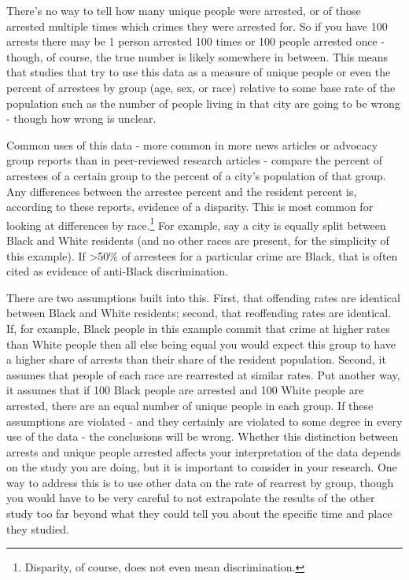 \documentclass[
]{krantz}
\begin{document}
There's no way to tell how many unique people were arrested,
or of those arrested multiple times which crimes they were
arrested for. So if you have 100 arrests there may be 1
person arrested 100 times or 100 people arrested once -
though, of course, the true number is likely somewhere in
between. This means that studies that try to use this data
as a measure of unique people or even the percent of
arrestees by group (age, sex, or race) relative to some base
rate of the population such as the number of people living
in that city are going to be wrong - though how wrong is
unclear.

Common uses of this data - more common in more news articles
or advocacy group reports than in peer-reviewed research
articles - compare the percent of arrestees of a certain
group to the percent of a city's population of that group.
Any differences between the arrestee percent and the
resident percent is, according to these reports, evidence of
a disparity. This is most common for looking at differences
by race.\footnote{Disparity, of course, does not even mean
  discrimination.} For example, say a city is equally split
between Black and White residents (and no other races are
present, for the simplicity of this example). If
\textgreater50\% of arrestees for a particular crime are
Black, that is often cited as evidence of anti-Black
discrimination.

There are two assumptions built into this. First, that
offending rates are identical between Black and White
residents; second, that reoffending rates are identical. If,
for example, Black people in this example commit that crime
at higher rates than White people then all else being equal
you would expect this group to have a higher share of
arrests than their share of the resident population. Second,
it assumes that people of each race are rearrested at
similar rates. Put another way, it assumes that if 100 Black
people are arrested and 100 White people are arrested, there
are an equal number of unique people in each group. If these
assumptions are violated - and they certainly are violated
to some degree in every use of the data - the conclusions
will be wrong. Whether this distinction between arrests and
unique people arrested affects your interpretation of the
data depends on the study you are doing, but it is important
to consider in your research. One way to address this is to
use other data on the rate of rearrest by group, though you
would have to be very careful to not extrapolate the results
of the other study too far beyond what they could tell you
about the specific time and place they studied.
\end{document}
